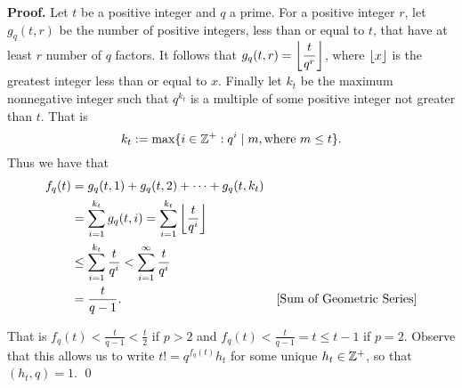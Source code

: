 \begin{enumerate}
      \textbf{Proof.} Let $t$ be a positive integer and $q$ a prime. For a
      positive integer $r$, let $g_q(t, r)$ be the number of positive integers,
      less than or equal to $t$, that have at least $r$ number of $q$ factors.
      It follows that $g_q(t, r) = \displaystyle\left\lfloor \frac{t}{q^r} \right\rfloor$, where $\left\lfloor x \right\rfloor$ is 
      the greatest integer less than or equal to $x$. Finally let $k_t$ be the 
      maximum nonnegative integer such that $q^{k_t}$ is a multiple of some 
      positive integer not greater than $t$. That is
      $$k_t := \max\{i \in \mathbb{Z}^+ : q^i \mid m, \text{where } m \le t\}.$$
      Thus we have that
      \begin{align*}
         f_q(t) &= g_q(t, 1) + g_q(t, 2) + \cdots + g_q(t, k_t) \\
            &= \sum_{i=1}^{k_t} g_q(t, i)
            = \sum_{i=1}^{k_t} \left\lfloor \frac{t}{q^i} \right\rfloor \\
            &\le \sum_{i=1}^{k_t} \frac{t}{q^i}
            < \sum_{i=1}^\infty \frac{t}{q^i} \\
            &= \frac{t}{q-1}. &[\text{Sum of Geometric Series}]
      \end{align*}

      That is $f_q(t) < \frac{t}{q-1} < \frac{t}{2}$ if $p > 2$ and
      $f_q(t) < \frac{t}{q-1} = t \le t - 1$ if $p = 2$. Observe that this
      allows us to write $t! = q^{f_q(t)} h_t$ for some unique $h_t \in \mathbb{Z}^+$, 
      so that $(h_t, q) = 1$. \qed \\


\end{enumerate}
